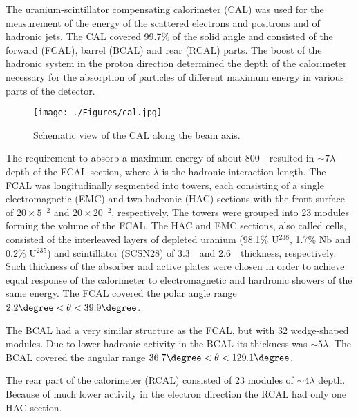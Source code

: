 The uranium-scintillator compensating calorimeter (CAL) was used for the measurement of the energy of the scattered electrons and positrons and of hadronic jets. The CAL covered 99.7\% of the solid angle and consisted of the forward (FCAL), barrel (BCAL) and rear (RCAL) parts. The boost of the hadronic system in the proton direction determined the depth of the calorimeter necessary for the absorption of particles of different maximum energy in various parts of the detector.
\begin{figure}[h]
	\centering
		\texttt{[image: ./Figures/cal.jpg]}
	\caption{Schematic view of the CAL along the beam axis.}
	\label{fig:cal}
\end{figure}

The requirement to absorb a maximum energy of about 800~\GeV\, resulted in $\sim 7 \lambda$ depth of the FCAL section, where $\lambda$ is the hadronic interaction length. The FCAL was longitudinally segmented into towers, each consisting of a single electromagnetic (EMC) and two hadronic (HAC) sections with the front-surface of $20 \times 5$~\cm$^{2}$ and $20 \times 20$~\cm$^{2}$, respectively. The towers were grouped into 23 modules forming the volume of the FCAL. The HAC and EMC sections, also called cells, consisted of the interleaved layers of depleted uranium (98.1\% U$^{238}$, 1.7\% Nb and 0.2\% U$^{235}$) and scintillator (SCSN28) of 3.3~\mm\, and 2.6~\mm\, thickness, respectively. Such thickness of the absorber and active plates were chosen in order to achieve equal response of the calorimeter to electromagnetic and hardronic showers of the same energy. The FCAL covered the polar angle range $2.2\degree < \theta < 39.9\degree$.

The BCAL had a very similar structure as the FCAL, but with 32 wedge-shaped modules. Due to lower hadronic activity in the BCAL its thickness was $\sim 5 \lambda$. The BCAL covered the angular range $36.7\degree< \theta <129.1\degree$.

The rear part of the calorimeter (RCAL) consisted of 23 modules of $\sim 4 \lambda$ depth. Because of much lower activity in the electron direction the RCAL had only one HAC section.

